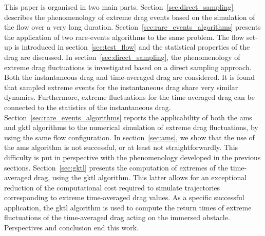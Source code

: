 This paper is organised in two main parts.
Section~\ref{sec:direct_sampling} describes the phenomenology of extreme drag events based on the simulation of the flow over a very long duration.
Section~\ref{sec:rare_events_algorithms} presents the application of two rare-events algorithms to the same
problem.
The flow set-up is introduced in section~\ref{sec:test_flow} and the statistical properties of the drag are discussed.
In section~\ref{sec:direct_sampling}, the phenomenology of  extreme drag fluctuations is investigated based on a direct sampling approach.
Both the instantaneous drag and time-averaged drag are considered.
It is found that sampled extreme events for the instantaneous drag share very similar dynamics.
Furthermore, extreme fluctuations for the time-averaged drag can be connected to the statistics of the instantaneous drag.
Section~\ref{sec:rare_events_algorithms} reports the applicability of both the \ac{ams} and \ac{gktl} algorithms to the numerical simulation of extreme drag fluctuations, by using the same flow configuration.
In section~\ref{sec:ams}, we show that the use of the \ac{ams} algorithm is not successful, or at least not straightforwardly.
This difficulty is put in perspective with the phenomenology developed in the previous sections.
Section~\ref{sec:gktl} presents the computation of extremes of the time-averaged drag, using the \ac{gktl} algorithm.
This latter allows for an exceptional reduction of the computational cost required to simulate trajectories corresponding to extreme time-averaged drag values.
As a specific successful application, the \ac{gktl} algorithm is used to compute the return times of extreme fluctuations of the time-averaged drag acting on the immersed obstacle.
Perspectives and conclusion end this work.

